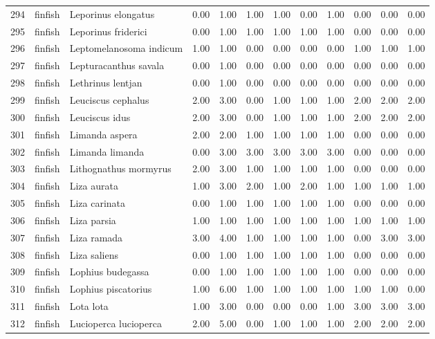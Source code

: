 \begin{table}[ht]
\begin{tabular}{rllrrrrrrrrr}
  294 & finfish & Leporinus elongatus & 0.00 & 1.00 & 1.00 & 1.00 & 0.00 & 1.00 & 0.00 & 0.00 & 0.00 \\ 
  295 & finfish & Leporinus friderici & 0.00 & 1.00 & 1.00 & 1.00 & 1.00 & 1.00 & 0.00 & 0.00 & 0.00 \\ 
  296 & finfish & Leptomelanosoma indicum & 1.00 & 1.00 & 0.00 & 0.00 & 0.00 & 0.00 & 1.00 & 1.00 & 1.00 \\ 
  297 & finfish & Lepturacanthus savala & 0.00 & 1.00 & 0.00 & 0.00 & 0.00 & 0.00 & 0.00 & 0.00 & 0.00 \\ 
  298 & finfish & Lethrinus lentjan & 0.00 & 1.00 & 0.00 & 0.00 & 0.00 & 0.00 & 0.00 & 0.00 & 0.00 \\ 
  299 & finfish & Leuciscus cephalus & 2.00 & 3.00 & 0.00 & 1.00 & 1.00 & 1.00 & 2.00 & 2.00 & 2.00 \\ 
  300 & finfish & Leuciscus idus & 2.00 & 3.00 & 0.00 & 1.00 & 1.00 & 1.00 & 2.00 & 2.00 & 2.00 \\ 
  301 & finfish & Limanda aspera & 2.00 & 2.00 & 1.00 & 1.00 & 1.00 & 1.00 & 0.00 & 0.00 & 0.00 \\ 
  302 & finfish & Limanda limanda & 0.00 & 3.00 & 3.00 & 3.00 & 3.00 & 3.00 & 0.00 & 0.00 & 0.00 \\ 
  303 & finfish & Lithognathus mormyrus & 2.00 & 3.00 & 1.00 & 1.00 & 1.00 & 1.00 & 0.00 & 0.00 & 0.00 \\ 
  304 & finfish & Liza aurata & 1.00 & 3.00 & 2.00 & 1.00 & 2.00 & 1.00 & 1.00 & 1.00 & 1.00 \\ 
  305 & finfish & Liza carinata & 0.00 & 1.00 & 1.00 & 1.00 & 1.00 & 1.00 & 0.00 & 0.00 & 0.00 \\ 
  306 & finfish & Liza parsia & 1.00 & 1.00 & 1.00 & 1.00 & 1.00 & 1.00 & 1.00 & 1.00 & 1.00 \\ 
  307 & finfish & Liza ramada & 3.00 & 4.00 & 1.00 & 1.00 & 1.00 & 1.00 & 0.00 & 3.00 & 3.00 \\ 
  308 & finfish & Liza saliens & 0.00 & 1.00 & 1.00 & 1.00 & 1.00 & 1.00 & 0.00 & 0.00 & 0.00 \\ 
  309 & finfish & Lophius budegassa & 0.00 & 1.00 & 1.00 & 1.00 & 1.00 & 1.00 & 0.00 & 0.00 & 0.00 \\ 
  310 & finfish & Lophius piscatorius & 1.00 & 6.00 & 1.00 & 1.00 & 1.00 & 1.00 & 1.00 & 1.00 & 0.00 \\ 
  311 & finfish & Lota lota & 1.00 & 3.00 & 0.00 & 0.00 & 0.00 & 1.00 & 3.00 & 3.00 & 3.00 \\ 
  312 & finfish & Lucioperca lucioperca & 2.00 & 5.00 & 0.00 & 1.00 & 1.00 & 1.00 & 2.00 & 2.00 & 2.00 \\ 

\end{tabular}
\end{table}

